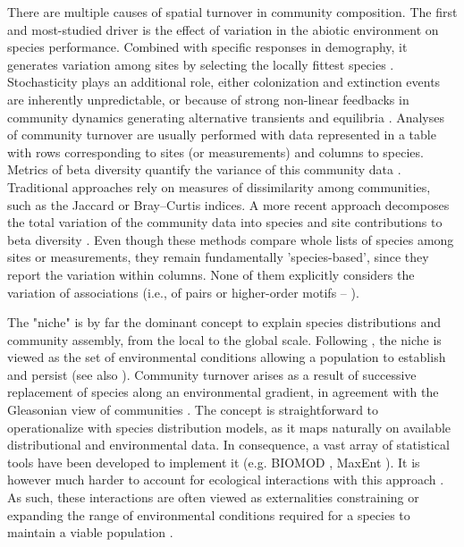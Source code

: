 \documentclass[12pt]{article}
\begin{document}
There are multiple causes of spatial turnover in community composition. The
first and most-studied driver is the effect of variation in the abiotic
environment on species performance. Combined with specific responses in
demography, it generates variation among sites by selecting the locally
fittest species \citep{Leibold2004}. Stochasticity plays an additional role,
either colonization and extinction events \citep{Hanski1999} are inherently
unpredictable, or because of strong non-linear feedbacks in community dynamics generating alternative
transients and equilibria \citep{Chase2007, Vellend2014}. Analyses of
community turnover are usually performed with data represented in a table with
rows corresponding to sites (or measurements) and columns to species. Metrics
of beta diversity quantify the variance of this community data
\citep{Legendre2005}. Traditional approaches rely on measures of dissimilarity
among communities, such as the Jaccard or Bray–Curtis indices. A more recent
approach decomposes the total variation of the community data into species and
site contributions to beta diversity \citep{Legendre2013}. Even though these
methods compare whole lists of species among sites or measurements, they
remain fundamentally ’species-based’, since they report the variation within
columns. None of them explicitly considers the variation of associations
(i.e., of pairs or higher-order motifs – \citealt{Stouffer2007}).

The "niche" is by far the dominant concept to explain species distributions
and community assembly, from the local to the global scale. Following
\citealt{Hutchinson1957}, the niche is viewed as the set of environmental
conditions allowing a population to establish and persist (see also
\citealt{Holt2009}). Community turnover arises as a result of successive
replacement of species along an environmental gradient, in agreement with the
Gleasonian view of communities \citep{Gleason1926}. The concept is
straightforward to operationalize with species distribution models, as it maps
naturally on available distributional and environmental data. In consequence,
a vast array of statistical tools have been developed to implement it (e.g.
BIOMOD \citealt{Thuiller2003}, MaxEnt \citealt{Phillips2006}). It is however
much harder to account for ecological interactions with this approach
\citep{Peterson2011}. As such, these interactions are often viewed as externalities
constraining or expanding the range of environmental conditions required for a
species to maintain a viable population \citep{Pulliam2000, Soberon2007, Boulangeat2012}.
\end{document}
